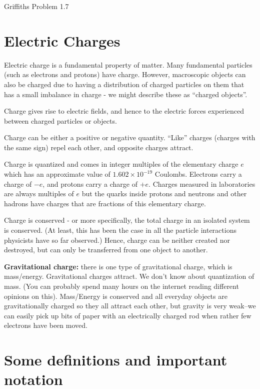 \documentclass[
  letterpaper,
  DIV=11,
  numbers=noendperiod]{scrreprt}
\begin{document}
Griffiths Problem 1.7

\section{Electric Charges}\label{sec-charge}

Electric charge is a fundamental property of matter. Many fundamental
particles (such as electrons and protons) have charge. However,
macroscopic objects can also be charged due to having a distribution of
charged particles on them that has a small imbalance in charge - we
might describe these as ``charged objects''.

Charge gives rise to electric fields, and hence to the electric forces
experienced between charged particles or objects.

Charge can be either a positive or negative quantity. ``Like'' charges
(charges with the same sign) repel each other, and opposite charges
attract.

Charge is quantized and comes in integer multiples of the elementary
charge \(e\) which has an approximate value of
\(1.602 \times 10 ^{-19}\) Coulombs. Electrons carry a charge of \(-e\),
and protons carry a charge of \(+e\). Charges measured in laboratories
are always multiples of \(e\) but the quarks inside protons and neutrons
and other hadrons have charges that are fractions of this elementary
charge.

Charge is conserved - or more specifically, the total charge in an
isolated system is conserved. (At least, this has been the case in all
the particle interactions physicists have so far observed.) Hence,
charge can be neither created nor destroyed, but can only be transferred
from one object to another.

\textbf{Gravitational charge:} there is one type of gravitational
charge, which is mass/energy. Gravitational charges attract. We don't
know about quantization of mass. (You can probably spend many hours on
the internet reading different opinions on this). Mass/Energy is
conserved and all everyday objects are gravitationally charged so they
all attract each other, but gravity is very weak--we can easily pick up
bits of paper with an electrically charged rod when rather few electrons
have been moved.

\section{Some definitions and important
notation}\label{some-definitions-and-important-notation}
\end{document}
